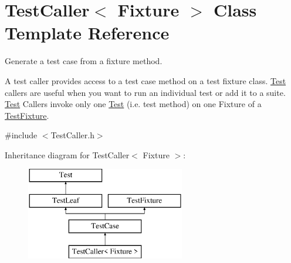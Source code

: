 \hypertarget{class_test_caller}{}\section{Test\+Caller$<$ Fixture $>$ Class Template Reference}
\label{class_test_caller}


Generate a test case from a fixture method.

A test caller provides access to a test case method on a test fixture class. \hyperlink{class_test}{Test} callers are useful when you want to run an individual test or add it to a suite. \hyperlink{class_test}{Test} Callers invoke only one \hyperlink{class_test}{Test} (i.\+e. test method) on one Fixture of a \hyperlink{class_test_fixture}{Test\+Fixture}.  




{\ttfamily \#include $<$Test\+Caller.\+h$>$}

Inheritance diagram for Test\+Caller$<$ Fixture $>$\+:\begin{figure}[H]
\begin{center}
\leavevmode
\includegraphics[height=4.000000cm]{class_test_caller}
\end{center}
\end{figure}
